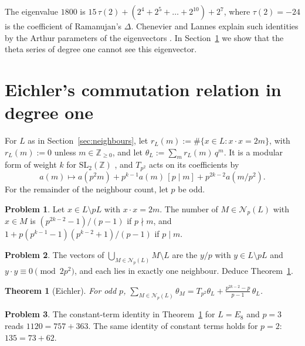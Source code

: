 \documentclass[reqno]{amsart}
\theoremstyle{definition}
\newtheorem{problem}{Problem}[section]
\theoremstyle{plain}
\newtheorem{theorem}{Theorem}[section]
\newcommand{\Z}{\mathbb{Z}}
\newcommand{\Nb}{\mathcal{N}}
\begin{document}
The eigenvalue \(1800\) is \(15\,\tau(2) + (2^4 + 2^5 + \dots + 2^{10}) + 2^7\), where \(\tau(2) = -24\) is the coefficient of Ramanujan's \(\Delta\).  Chenevier and Lannes explain such identities by the Arthur parameters of the eigenvectors \cite{CL}.  In Section~\ref{sec:eichler} we show that the theta series of degree one cannot see this eigenvector.


\section{Eichler's commutation relation in degree one}\label{sec:eichler}

For \(L\) as in Section~\ref{sec:neighbours}, let \(r_L(m) := \#\{x \in L : x \cdot x = 2m\}\), with \(r_L(m) := 0\) unless \(m \in \Z_{\ge 0}\), and let \(\theta_L := \sum_m r_L(m)\, q^m\).  It is a modular form of weight \(k\) for \(\mathrm{SL}_2(\Z)\) \cite[Ch.~VII]{SeA}, and \(T_{p^2}\) acts on its coefficients by
\[
  a(m) \mapsto a(p^2m) + p^{k-1} a(m)\,[p \mid m] + p^{2k-2} a(m/p^2) .
\]
For the remainder of the neighbour count, let \(p\) be odd.

\begin{problem}\label{pr:count-in}
Let \(x \in L \setminus pL\) with \(x \cdot x = 2m\).  The number of \(M \in \Nb_p(L)\) with \(x \in M\) is \((p^{2k-2} - 1)/(p - 1)\) if \(p \nmid m\), and \(1 + p(p^{k-1} - 1)(p^{k-2} + 1)/(p - 1)\) if \(p \mid m\).
\end{problem}

\begin{problem}\label{pr:count-out}
The vectors of \(\bigcup_{M \in \Nb_p(L)} M \setminus L\) are the \(y/p\) with \(y \in L \setminus pL\) and \(y \cdot y \equiv 0 \pmod{2p^2}\), and each lies in exactly one neighbour.  Deduce Theorem~\ref{thm:eichler}.
\end{problem}

\begin{theorem}[Eichler]\label{thm:eichler}
For odd \(p\),
\(\displaystyle \sum_{M \in \Nb_p(L)} \theta_M = T_{p^2}\theta_L + \frac{p^{2k-2} - p}{p - 1}\,\theta_L\).
\end{theorem}

\begin{problem}\label{pr:eichler-check}
The constant-term identity in Theorem~\ref{thm:eichler} for \(L = E_8\) and \(p = 3\) reads \(1120 = 757 + 363\).  The same identity of constant terms holds for \(p = 2\): \(135 = 73 + 62\).
\end{problem}
\end{document}
